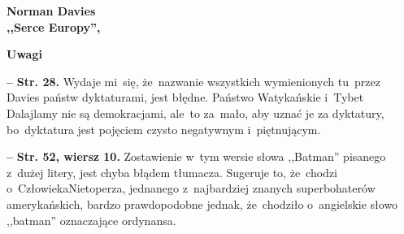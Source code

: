 \documentclass[a4paper,11pt]{article}
\newcommand{\spaceOne}{2em}
\newcommand{\tb}{\textbf}
\newcommand{\noi}{\noindent}
\newcommand{\start}{\noi \tb{--} {}}
\newcommand{\Center}[1]{\begin{center} #1 \end{center}}
\newcommand{\CenterTB}[1]{\Center{\tb{#1}}}
\newcommand{\Str}[1]{\tb{Str. #1.}}
\newcommand{\StrWg}[2]{\tb{Str. #1, wiersz #2.}}
\newcommand{\StrWd}[2]{\tb{Str. #1, wiersz #2 (od dołu).}}
\newcommand{\Work}[1]{ \begin{center} {\large \tb{#1}} \end{center} }
\begin{document}
\vspace{\spaceOne}



\Work{
  Norman Davies \\
  ,,Serce Europy'', \cite{Davies14} }


\CenterTB{Uwagi}

\start \Str{28} Wydaje mi~się, że~nazwanie wszystkich wymienionych
tu~przez Davies państw dyktaturami, jest błędne. Państwo Watykańskie
i~Tybet Dalajlamy nie są demokracjami, ale~to za~mało, aby uznać je za
dyktatury, bo~dyktatura jest pojęciem czysto negatywnym i~piętnującym.

\start \StrWg{52}{10} Zostawienie w~tym wersie słowa ,,Batman''
pisanego z~dużej litery, jest chyba błądem tłumacza. Sugeruje to,
że~chodzi o~Człowieka\dywiz Nietoperza, jednanego z~najbardziej
znanych superbohaterów amerykańskich, bardzo prawdopodobne jednak,
że~chodziło o~angielskie słowo ,,batman'' oznaczające ordynansa.



\end{document}
